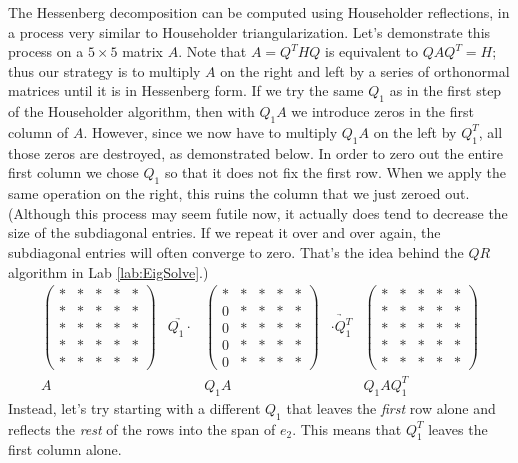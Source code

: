 The Hessenberg decomposition can be computed using Householder reflections, in a process very similar to Householder triangularization.
Let's demonstrate this process on a $5 \times 5$ matrix $A$.
Note that $A=Q^THQ$ is equivalent to $QAQ^T = H$; thus our strategy is to multiply $A$ on the right and left by a series of orthonormal matrices until it is in Hessenberg form.
If we try the same $Q_1$ as in the first step of the Householder algorithm, then with $Q_1 A$ we introduce zeros in the first column of $A$.
However, since we now have to multiply $Q_1 A$ on the left by $Q_1^T$, all those zeros are destroyed, as demonstrated below.
In order to zero out the entire first column we chose $Q_1$ so that it does not fix the first row.
When we apply the same operation on the right, this ruins the column that we just zeroed out.
(Although this process may seem futile now, it actually does tend to decrease the size of the subdiagonal entries.
If we repeat it over and over again, the subdiagonal entries will often converge to zero.
That's the idea behind the $QR$ algorithm in Lab \ref{lab:EigSolve}.)
\[
\begin{array}{ccccc} 
\begin{pmatrix}
* & * & * & * & * \\
* & * & * & * & * \\
* & * & * & * & * \\
* & * & * & * & * \\
* & * & * & * & *
\end{pmatrix} 
&\underrightarrow{Q_1 \cdot }&
\begin{pmatrix}
* & * & * & * & * \\
0 & * & * & * & * \\
0 & * & * & * & * \\
0 & * & * & * & * \\
0 & * & * & * & *
\end{pmatrix} 
&\underrightarrow{\cdot Q_1^T }&
\begin{pmatrix}
* & * & * & * & * \\
* & * & * & * & * \\
* & * & * & * & * \\
* & * & * & * & * \\
* & * & * & * & *
\end{pmatrix} 
\\ 
A & & Q_1A & & Q_1 A Q_1^T
  \end{array}
\]
Instead, let's try starting with a different $Q_1$ that leaves the \emph{first} row alone and reflects the \emph{rest} of the rows into the span of $e_2$. This means that $Q_1^T$ leaves the first column alone.
